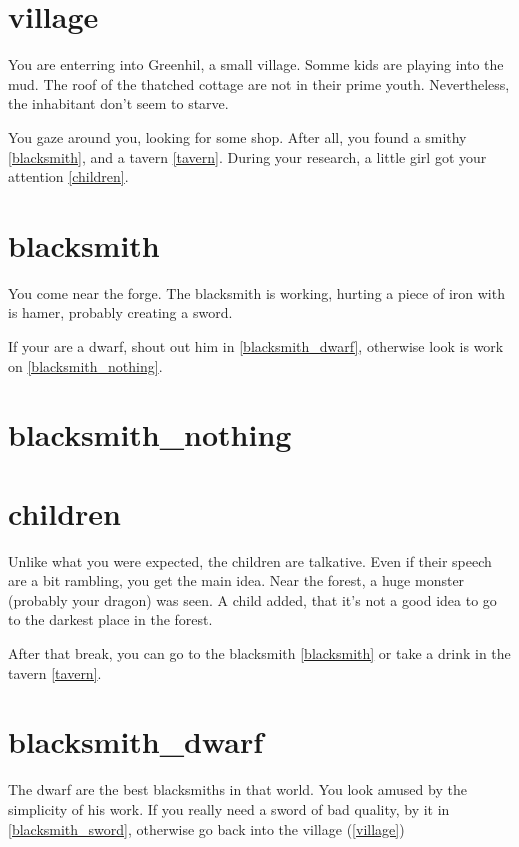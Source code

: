 
\section{village}

You are enterring into Greenhil, a small village. Somme kids are playing into
the mud. The roof of the thatched cottage are not in their prime youth.
Nevertheless, the inhabitant don't seem to starve.

You gaze around you, looking for some shop. After all, you found a smithy
\ref{blacksmith}, and a tavern \ref{tavern}. During your research, a little girl
got your attention \ref{children}.

\section{blacksmith}

You come near the forge. The blacksmith is working, hurting a piece of iron with
is hamer, probably creating a sword.

If your are a dwarf, shout out him in \ref{blacksmith_dwarf}, otherwise look is
work on \ref{blacksmith_nothing}.

\section{blacksmith_nothing}

\section{children}

Unlike what you were expected, the children are talkative. Even if their speech
are a bit rambling, you get the main idea. Near the forest, a huge monster
(probably your dragon) was seen. A child added, that it's not a good idea to go
to the darkest place in the forest.

After that break, you can go to the blacksmith \ref{blacksmith} or take a drink in
the tavern \ref{tavern}.

\section{blacksmith_dwarf}

The dwarf are the best blacksmiths in that world. You look amused by the
simplicity of his work. If you really need a sword of bad quality, by it in
\ref{blacksmith_sword}, otherwise go back into the village (\ref{village})

